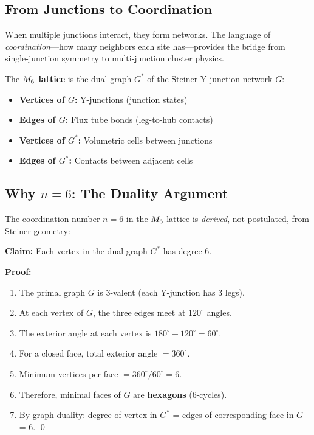 \subsection{From Junctions to Coordination}

When multiple junctions interact, they form networks. The language of
\emph{coordination}---how many neighbors each site has---provides the bridge
from single-junction symmetry to multi-junction cluster physics.

\begin{derivationbox}[title=Definition: $\Msix$ Coordination Lattice]
    The \textbf{$\Msix$ lattice} is the dual graph $G^*$ of the Steiner
    Y-junction network $G$:
    \begin{itemize}
        \item \textbf{Vertices of $G$:} Y-junctions (junction states)
        \item \textbf{Edges of $G$:} Flux tube bonds (leg-to-hub contacts)
        \item \textbf{Vertices of $G^*$:} Volumetric cells between junctions
        \item \textbf{Edges of $G^*$:} Contacts between adjacent cells
    \end{itemize}
    \tagDef
\end{derivationbox}

\subsection{Why $n = 6$: The Duality Argument}

The coordination number $n = 6$ in the $\Msix$ lattice is \emph{derived},
not postulated, from Steiner geometry:

\begin{derivationbox}[title={Derivation: \texorpdfstring{$n = 6$}{n = 6} from Graph Duality}]
    \textbf{Claim:} Each vertex in the dual graph $G^*$ has degree 6.

    \textbf{Proof:}
    \begin{enumerate}
        \item The primal graph $G$ is 3-valent (each Y-junction has 3 legs).
        \item At each vertex of $G$, the three edges meet at $120^\circ$ angles.
        \item The exterior angle at each vertex is $180^\circ - 120^\circ = 60^\circ$.
        \item For a closed face, total exterior angle $= 360^\circ$.
        \item Minimum vertices per face $= 360^\circ/60^\circ = 6$.
        \item Therefore, minimal faces of $G$ are \textbf{hexagons} (6-cycles).
        \item By graph duality: degree of vertex in $G^*$ = edges of
              corresponding face in $G$ = 6. \qed
    \end{enumerate}
    \tagDer
    \label{deriv:n_equals_6}
\end{derivationbox}

